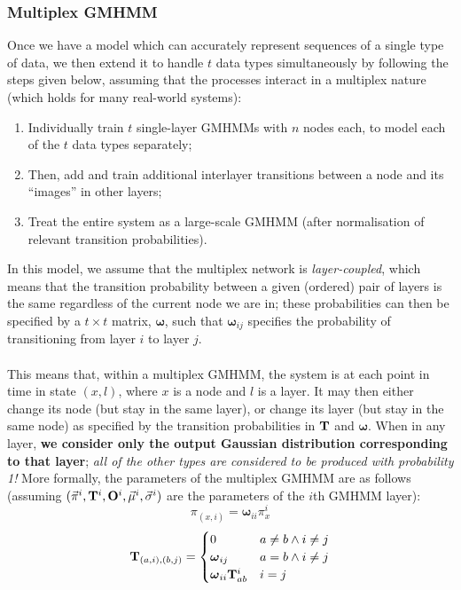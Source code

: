 \documentclass[12pt,openany]{article}
\begin{document}
	\subsubsection{Multiplex GMHMM}
	
	Once we have a model which can accurately represent sequences of a single type of data, we then extend it to handle $t$ data types simultaneously by following the steps given below, assuming that the processes interact in a multiplex nature (which holds for many real-world systems):
	\begin{enumerate}
		\item Individually train $t$ single-layer GMHMMs with $n$ nodes each, to model each of the $t$ data types separately;
		\item Then, add and train additional interlayer transitions between a node and its ``images'' in other layers;
		\item Treat the entire system as a large-scale GMHMM (after normalisation of relevant transition probabilities).
	\end{enumerate}
	In this model, we assume that the multiplex network is \emph{layer-coupled}, which means that the transition probability between a given (ordered) pair of layers is the same regardless of the current node we are in; these probabilities can then be specified by a $t \times t$ matrix, $\boldsymbol\omega$, such that ${\boldsymbol\omega}_{ij}$ specifies the probability of transitioning from layer $i$ to layer $j$.\\ \\
	This means that, within a multiplex GMHMM, the system is at each point in time in state $(x, l)$, where $x$ is a node and $l$ is a layer. It may then either change its node (but stay in the same layer), or change its layer (but stay in the same node) as specified by the transition probabilities in $\bf T$ and $\boldsymbol\omega$. When in any layer, {\bf we consider only the output Gaussian distribution corresponding to that layer}; {\it all of the other types are considered to be produced with probability 1!} More formally, the parameters of the multiplex GMHMM are as follows (assuming $(\vec{\pi}^i, {\bf T}^i, {\bf O}^i, \vec{\mu}^i, \vec{\sigma}^i)$ are the parameters of the $i$th GMHMM layer):
	\begin{equation}
	{\pi}_{(x, i)} = \boldsymbol\omega_{ii}\pi_x^i
\end{equation}
\begin{equation}
	{\bf T}_{(a, i), (b, j)} = \begin{cases}
 	0 & a\neq b \wedge i\neq j\\
 	\boldsymbol\omega_{ij} & a=b\wedge i\neq j\\
 	\boldsymbol\omega_{ii}{\bf T}_{ab}^{i} & i=j\\
 \end{cases}\end{equation}
\end{document}
